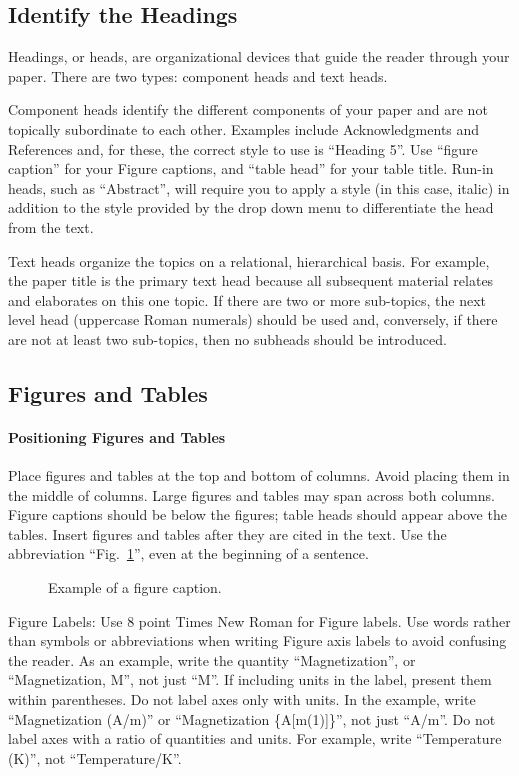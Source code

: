 \documentclass[conference]{IEEEtran}
\begin{document}
\subsection{Identify the Headings}
Headings, or heads, are organizational devices that guide the reader through 
your paper. There are two types: component heads and text heads.

Component heads identify the different components of your paper and are not 
topically subordinate to each other. Examples include Acknowledgments and 
References and, for these, the correct style to use is ``Heading 5''. Use 
``figure caption'' for your Figure captions, and ``table head'' for your 
table title. Run-in heads, such as ``Abstract'', will require you to apply a 
style (in this case, italic) in addition to the style provided by the drop 
down menu to differentiate the head from the text.

Text heads organize the topics on a relational, hierarchical basis. For 
example, the paper title is the primary text head because all subsequent 
material relates and elaborates on this one topic. If there are two or more 
sub-topics, the next level head (uppercase Roman numerals) should be used 
and, conversely, if there are not at least two sub-topics, then no subheads 
should be introduced.

\subsection{Figures and Tables}
\paragraph{Positioning Figures and Tables} Place figures and tables at the top and 
bottom of columns. Avoid placing them in the middle of columns. Large 
figures and tables may span across both columns. Figure captions should be 
below the figures; table heads should appear above the tables. Insert 
figures and tables after they are cited in the text. Use the abbreviation 
``Fig.~\ref{fig}'', even at the beginning of a sentence.



\begin{figure}[htbp]

\caption{Example of a figure caption.}
\label{fig}
\end{figure}

Figure Labels: Use 8 point Times New Roman for Figure labels. Use words 
rather than symbols or abbreviations when writing Figure axis labels to 
avoid confusing the reader. As an example, write the quantity 
``Magnetization'', or ``Magnetization, M'', not just ``M''. If including 
units in the label, present them within parentheses. Do not label axes only 
with units. In the example, write ``Magnetization (A/m)'' or ``Magnetization 
\{A[m(1)]\}'', not just ``A/m''. Do not label axes with a ratio of 
quantities and units. For example, write ``Temperature (K)'', not 
``Temperature/K''.
\end{document}
